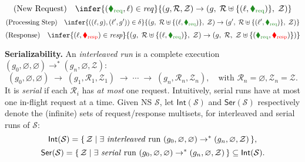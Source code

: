 \[
\text{(New Request)}\quad
\infer{({\color{ForestGreen}\blacklozenge_\text{req}},\ell)\in\mathit{req}}
{(g,\mathcal{R},\mathcal{Z}) \rightarrow (g,\; \mathcal{R}\uplus\{(\ell,{\color{ForestGreen}\blacklozenge_\text{req}})\},\; \mathcal{Z})}
\]
\[
\text{(Processing Step)}\quad
\infer{((\ell, g),(\ell', g'))\in\delta}
{(g,\; \mathcal{R}\uplus\{(\ell,{\color{ForestGreen}\blacklozenge_\text{req}})\},\; \mathcal{Z})
	\rightarrow
	(g',\; \mathcal{R}\uplus\{(\ell',{\color{ForestGreen}\blacklozenge_\text{req}})\},\; \mathcal{Z})}
\]
\[
\text{(Response)}\quad
\infer{(\ell,{\color{red}\blacklozenge_\text{resp}})\in\mathit{resp}}
{(g,\; \mathcal{R}\uplus\{(\ell,{\color{ForestGreen}\blacklozenge_\text{req}})\},\; \mathcal{Z})
	\rightarrow
	(g,\; \mathcal{R},\; \mathcal{Z} \uplus \{({\color{ForestGreen}\blacklozenge_\text{req}},{\color{red}\blacklozenge_\text{resp}})\})}
\]


\smallskip
\noindent
\textbf{Serializability.}
An \textit{interleaved run} is a complete execution 
\((g_0,\varnothing,\varnothing)\!\to^*\!(g_n,\varnothing,\mathcal{Z})\):
\[
(g_0,\varnothing,\varnothing) \;\to\; (g_1,\mathcal{R}_1,\mathcal{Z}_1) \;\to\; \cdots \;\to\; 
(g_n,\mathcal{R}_{n},\mathcal{Z}_{n}),
\quad
\text{with } \mathcal{R}_{n}=\varnothing,\mathcal{Z}_n=\mathcal{Z}.
\]
It is \textit{serial} if each $\mathcal{R}_i$ has \textit{at most} one request.
	Intuitively, serial runs have at most one in-flight request at a time.
	Given NS \(\mathcal{S}\), let \(\mathsf{Int}(\mathcal{S})\) and \(\mathsf{Ser}(\mathcal{S})\)  respectively denote the (infinite) sets of request/response multisets, for interleaved and serial runs of \(\mathcal{S}\):
%
\[
\mathsf{Int}(\mathcal{S})=\{\,\mathcal{Z}\mid \exists\text{ \textit{interleaved} run }(g_0,\varnothing,\varnothing)\rightarrow^{*}(g_n,\varnothing,\mathcal{Z})\,\},
\]
\[
\mathsf{Ser}(\mathcal{S})=\{\,\mathcal{Z}\mid \exists\text{ \textit{serial} run }(g_0,\varnothing,\varnothing)\rightarrow^{*}(g_n,\varnothing,\mathcal{Z})\,\}\subseteq \mathsf{Int}(\mathcal{S}).
\]

